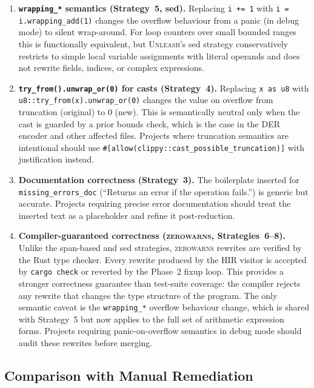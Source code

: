 \documentclass[sigconf,review,anonymous]{acmart}
\newcommand{\tool}{\textsc{Unleash}\xspace}
\newcommand{\zerowarns}{\textsc{zerowarns}\xspace}
\begin{document}
\begin{enumerate}
  \item \textbf{\texttt{wrapping\_*} semantics (Strategy~5, sed).}
    Replacing \texttt{i += 1} with \texttt{i = i.wrapping\_add(1)} changes
    the overflow behaviour from a panic (in debug mode) to silent wrap-around.
    For loop counters over small bounded ranges this is functionally equivalent,
    but \tool's sed strategy conservatively restricts to simple local variable
    assignments with literal operands and does not rewrite fields, indices, or
    complex expressions.

  \item \textbf{\texttt{try\_from().unwrap\_or(0)} for casts (Strategy~4).}
    Replacing \texttt{x as u8} with \texttt{u8::try\_from(x).unwrap\_or(0)}
    changes the value on overflow from truncation (original) to 0 (new).
    This is semantically neutral only when the cast is guarded by a prior
    bounds check, which is the case in the DER encoder and other affected
    files.
    Projects where truncation semantics are intentional should use
    \texttt{\#[allow(clippy::cast\_possible\_truncation)]} with justification
    instead.

  \item \textbf{Documentation correctness (Strategy~3).}
    The boilerplate inserted for \texttt{missing\_errors\_doc}
    (``Returns an error if the operation fails.'') is generic but accurate.
    Projects requiring precise error documentation should treat the inserted
    text as a placeholder and refine it post-reduction.

  \item \textbf{Compiler-guaranteed correctness (\zerowarns, Strategies~6--8).}
    Unlike the span-based and sed strategies, \zerowarns rewrites are verified
    by the Rust type checker.
    Every rewrite produced by the HIR visitor is accepted by \texttt{cargo check}
    or reverted by the Phase~2 fixup loop.
    This provides a stronger correctness guarantee than test-suite coverage:
    the compiler rejects any rewrite that changes the type structure of the
    program.
    The only semantic caveat is the \texttt{wrapping\_*} overflow behaviour
    change, which is shared with Strategy~5 but now applies to the full set of
    arithmetic expression forms.
    Projects requiring panic-on-overflow semantics in debug mode should audit
    these rewrites before merging.
\end{enumerate}

\subsection{Comparison with Manual Remediation}
\end{document}
